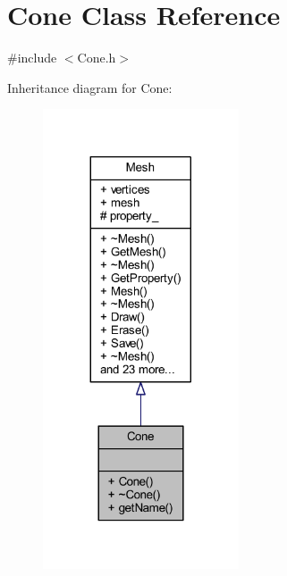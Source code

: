 \hypertarget{class_cone}{}\section{Cone Class Reference}
\label{class_cone}


{\ttfamily \#include $<$Cone.\+h$>$}



Inheritance diagram for Cone\+:\nopagebreak
\begin{figure}[H]
\begin{center}
\leavevmode
\includegraphics[width=164pt]{class_cone__inherit__graph}
\end{center}
\end{figure}


